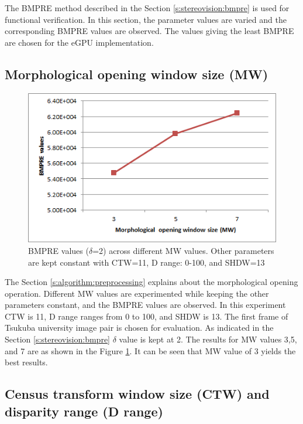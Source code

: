The BMPRE method described in the Section \ref{s:stereovision:bmpre} is used for functional verification. In this section, the parameter values are varied and the corresponding BMPRE values are observed. The values giving the least BMPRE are chosen for the eGPU implementation.

\subsection{Morphological opening window size (MW)}
\label{s:fverificationres:mw}

\begin{figure}
  \center
  \captionsetup{justification=centering}
  \includegraphics[width=.8\linewidth]{figures/BMPRE1}
  \caption{BMPRE values ($\delta$=2) across different MW values. Other parameters are kept constant with CTW=11, D range: 0-100, and SHDW=13}
  \label{fig:bmpre1}
\end{figure}


The Section \ref{s:algorithm:preprocessing} explains about the morphological opening operation. Different MW values are experimented while keeping the other parameters constant, and the BMPRE values are observed. In this experiment CTW is 11, D range ranges from 0 to 100, and SHDW is 13. The first frame of Tsukuba university image pair is chosen for evaluation. As indicated in the Section \ref{s:stereovision:bmpre} $\delta$ value is kept at 2. The results for MW values 3,5, and 7 are as shown in the Figure \ref{fig:bmpre1}. It can be seen that MW value of 3 yields the best results.

\subsection{Census transform window size (CTW) and disparity range (D range)}
\label{s:fverificationres:mw}

